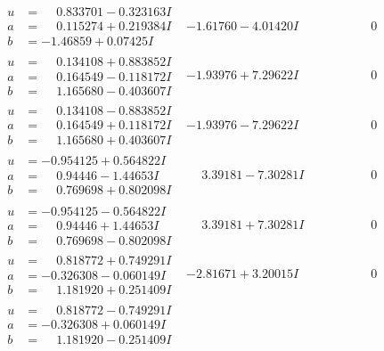\documentclass[1p]{elsarticle_modified}
\theoremstyle{definition}
\begin{document}
$$\begin{array}{c|c|c}
\begin{aligned}
u &= \phantom{-}0.833701 - 0.323163 I \\
a &= \phantom{-}0.115274 + 0.219384 I \\
b &= -1.46859 + 0.07425 I\end{aligned}
 & -1.61760 - 4.01420 I & \phantom{-0.000000 } 0 \\ \hline\begin{aligned}
u &= \phantom{-}0.134108 + 0.883852 I \\
a &= \phantom{-}0.164549 - 0.118172 I \\
b &= \phantom{-}1.165680 - 0.403607 I\end{aligned}
 & -1.93976 + 7.29622 I & \phantom{-0.000000 } 0 \\ \hline\begin{aligned}
u &= \phantom{-}0.134108 - 0.883852 I \\
a &= \phantom{-}0.164549 + 0.118172 I \\
b &= \phantom{-}1.165680 + 0.403607 I\end{aligned}
 & -1.93976 - 7.29622 I & \phantom{-0.000000 } 0 \\ \hline\begin{aligned}
u &= -0.954125 + 0.564822 I \\
a &= \phantom{-}0.94446 - 1.44653 I \\
b &= \phantom{-}0.769698 + 0.802098 I\end{aligned}
 & \phantom{-}3.39181 - 7.30281 I & \phantom{-0.000000 } 0 \\ \hline\begin{aligned}
u &= -0.954125 - 0.564822 I \\
a &= \phantom{-}0.94446 + 1.44653 I \\
b &= \phantom{-}0.769698 - 0.802098 I\end{aligned}
 & \phantom{-}3.39181 + 7.30281 I & \phantom{-0.000000 } 0 \\ \hline\begin{aligned}
u &= \phantom{-}0.818772 + 0.749291 I \\
a &= -0.326308 - 0.060149 I \\
b &= \phantom{-}1.181920 + 0.251409 I\end{aligned}
 & -2.81671 + 3.20015 I & \phantom{-0.000000 } 0 \\ \hline\begin{aligned}
u &= \phantom{-}0.818772 - 0.749291 I \\
a &= -0.326308 + 0.060149 I \\
b &= \phantom{-}1.181920 - 0.251409 I\end{aligned}

\end{array}$$
\end{document}
